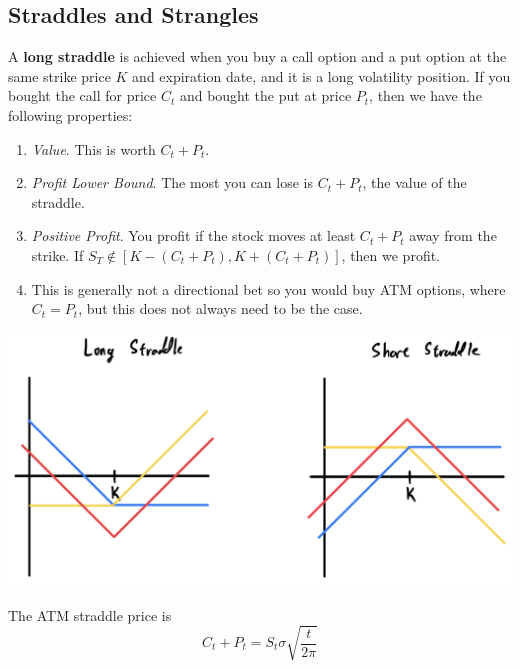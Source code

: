 \documentclass{article}
\begin{document}
  \subsection{Straddles and Strangles}

    \begin{definition}[Straddles, Y]
      A \textbf{long straddle} is achieved when you buy a call option and a put option at the same strike price $K$ and expiration date, and it is a long volatility position. If you bought the call for price $C_t$ and bought the put at price $P_t$, then we have the following properties: 
      \begin{enumerate}
        \item \textit{Value}. This is worth $C_t + P_t$. 
        \item \textit{Profit Lower Bound}. The most you can lose is $C_t + P_t$, the value of the straddle.  
        \item \textit{Positive Profit}. You profit if the stock moves at least $C_t + P_t$ away from the strike. If $S_T \not\in [K - (C_t + P_t), K + (C_t + P_t)]$, then we profit. 
        \item This is generally not a directional bet so you would buy ATM options, where $C_t = P_t$, but this does not always need to be the case. 
      \end{enumerate}
      \begin{center}
        \includegraphics[scale=0.3]{img/straddle.png}
      \end{center}
    \end{definition}

    \begin{theorem}
      The ATM straddle price is 
      \begin{equation}
        C_t + P_t = S_t \sigma \sqrt{\frac{t}{2 \pi}} 
      \end{equation}
    \end{theorem}
\end{document}
